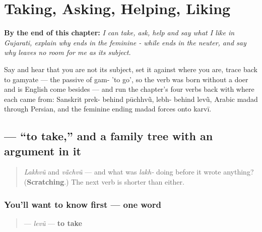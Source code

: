 
\chapter{Taking, Asking, Helping, Liking}
\label{ch:gu-doing-verbs}

\begin{chapteropening}
\textbf{By the end of this chapter:} \emph{I can take, ask, help and say what I like in Gujarati, explain why   ends in the feminine - while   ends in the neuter, and say why     leaves no room for me as its subject.}

Say     and hear that you are not its subject, set it against     where you are, trace  back to gamyate — the passive of gam- 'to go', so the verb was born without a doer and is English come besides — and run the chapter's four verbs back with where each came from: Sanskrit prek- behind pūchhvũ, lebh- behind levũ, Arabic madad through Persian, and the feminine ending madad forces onto karvī.
\end{chapteropening}

\section[\texorpdfstring{\gu{લેવું} (levũ)}{લેવું (levũ)}]{ — \textquotedblleft{}to take,\textquotedblright{} and a family tree with an argument in it}

\label{lesson:GU-C09-levun}



\begin{quote}
\emph{Lakhvũ} and \emph{vā̃chvũ} — and what was \emph{lakh-} doing before it wrote anything? (\textbf{Scratching}.) The next verb is shorter than either.
\end{quote}

\subsection*{You'll want to know first — one word}
\begin{quote}
\textbf{} — \emph{levũ} — \textbf{to take}
\end{quote}

